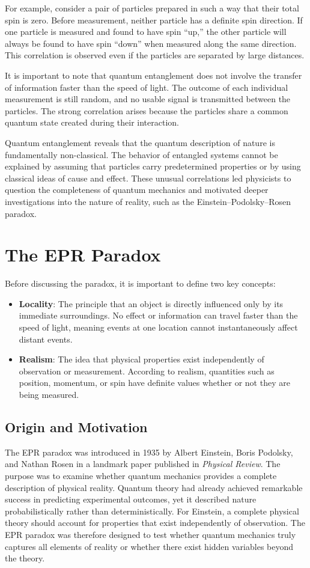 \documentclass[17pt,a4paper]{extarticle}
\begin{document}
For example, consider a pair of particles prepared in such a way that their total spin is zero. Before measurement, neither particle has a definite spin direction. If one particle is measured and found to have spin “up,” the other particle will always be found to have spin “down” when measured along the same direction. This correlation is observed even if the particles are separated by large distances.

It is important to note that quantum entanglement does not involve the transfer of information faster than the speed of light. The outcome of each individual measurement is still random, and no usable signal is transmitted between the particles. The strong correlation arises because the particles share a common quantum state created during their interaction.

Quantum entanglement reveals that the quantum description of nature is fundamentally non-classical. The behavior of entangled systems cannot be explained by assuming that particles carry predetermined properties or by using classical ideas of cause and effect. These unusual correlations led physicists to question the completeness of quantum mechanics and motivated deeper investigations into the nature of reality, such as the Einstein–Podolsky–Rosen paradox.

\section{The EPR Paradox}
Before discussing the paradox, it is important to define two key concepts:
\begin{itemize}
\item \textbf{Locality}: The principle that an object is directly influenced only by its immediate surroundings. No effect or information can travel faster than the speed of light, meaning events at one location cannot instantaneously affect distant events.
\item \textbf{Realism}: The idea that physical properties exist independently of observation or measurement. According to realism, quantities such as position, momentum, or spin have definite values whether or not they are being measured.
\end{itemize}
\subsection{Origin and Motivation}
The EPR paradox was introduced in 1935 by Albert Einstein, Boris Podolsky, and Nathan Rosen in a landmark paper published in \textit{Physical Review}. The purpose was to examine whether quantum mechanics provides a complete description of physical reality. Quantum theory had already achieved remarkable success in predicting experimental outcomes, yet it described nature probabilistically rather than deterministically. For Einstein, a complete physical theory should account for properties that exist independently of observation. The EPR paradox was therefore designed to test whether quantum mechanics truly captures all elements of reality or whether there exist hidden variables beyond the theory.
\end{document}
